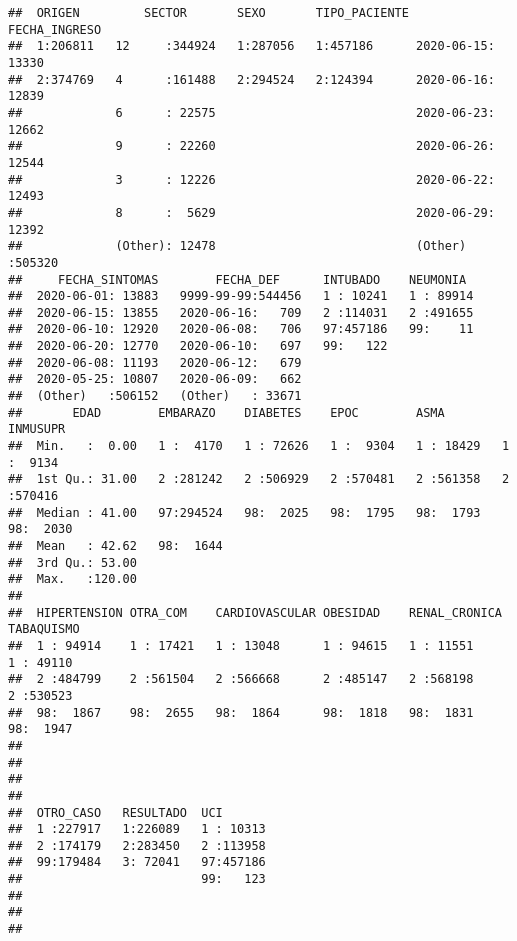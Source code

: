 \documentclass[]{article}
\begin{document}
\begin{verbatim}
##  ORIGEN         SECTOR       SEXO       TIPO_PACIENTE    FECHA_INGRESO   
##  1:206811   12     :344924   1:287056   1:457186      2020-06-15: 13330  
##  2:374769   4      :161488   2:294524   2:124394      2020-06-16: 12839  
##             6      : 22575                            2020-06-23: 12662  
##             9      : 22260                            2020-06-26: 12544  
##             3      : 12226                            2020-06-22: 12493  
##             8      :  5629                            2020-06-29: 12392  
##             (Other): 12478                            (Other)   :505320  
##     FECHA_SINTOMAS        FECHA_DEF      INTUBADO    NEUMONIA   
##  2020-06-01: 13883   9999-99-99:544456   1 : 10241   1 : 89914  
##  2020-06-15: 13855   2020-06-16:   709   2 :114031   2 :491655  
##  2020-06-10: 12920   2020-06-08:   706   97:457186   99:    11  
##  2020-06-20: 12770   2020-06-10:   697   99:   122              
##  2020-06-08: 11193   2020-06-12:   679                          
##  2020-05-25: 10807   2020-06-09:   662                          
##  (Other)   :506152   (Other)   : 33671                          
##       EDAD        EMBARAZO    DIABETES    EPOC        ASMA        INMUSUPR   
##  Min.   :  0.00   1 :  4170   1 : 72626   1 :  9304   1 : 18429   1 :  9134  
##  1st Qu.: 31.00   2 :281242   2 :506929   2 :570481   2 :561358   2 :570416  
##  Median : 41.00   97:294524   98:  2025   98:  1795   98:  1793   98:  2030  
##  Mean   : 42.62   98:  1644                                                  
##  3rd Qu.: 53.00                                                              
##  Max.   :120.00                                                              
##                                                                              
##  HIPERTENSION OTRA_COM    CARDIOVASCULAR OBESIDAD    RENAL_CRONICA TABAQUISMO 
##  1 : 94914    1 : 17421   1 : 13048      1 : 94615   1 : 11551     1 : 49110  
##  2 :484799    2 :561504   2 :566668      2 :485147   2 :568198     2 :530523  
##  98:  1867    98:  2655   98:  1864      98:  1818   98:  1831     98:  1947  
##                                                                               
##                                                                               
##                                                                               
##                                                                               
##  OTRO_CASO   RESULTADO  UCI        
##  1 :227917   1:226089   1 : 10313  
##  2 :174179   2:283450   2 :113958  
##  99:179484   3: 72041   97:457186  
##                         99:   123  
##                                    
##                                    
## 
\end{verbatim}
\end{document}
